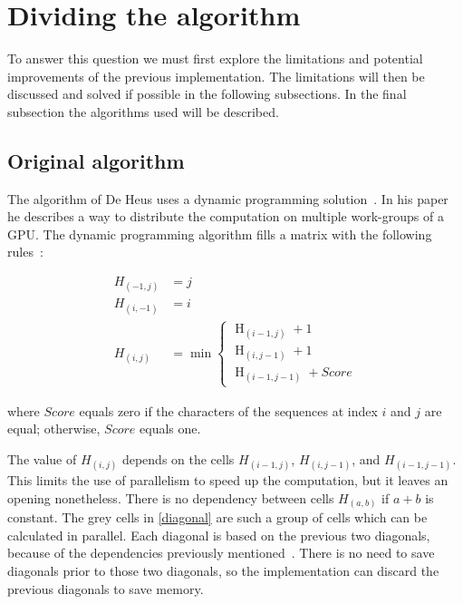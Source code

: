 \section{Dividing the algorithm} \label{q1}
To answer this question we must first explore the limitations and potential improvements of the previous implementation.
The limitations will then be discussed and solved if possible in the following subsections.
In the final subsection the algorithms used will be described.

\subsection{Original algorithm} \label{originalalg}
The algorithm of De Heus uses a dynamic programming solution~\cite{Heus}.
In his paper he describes a way to distribute the computation on multiple work-groups of a GPU.
The dynamic programming algorithm fills a matrix with the following rules~\cite{Jordan}:

\begin{equation} \label{eq1}
\begin{split}
H_{(-1,j)} & = j \\
H_{(i,-1)} & = i \\
H_{(i,j)} & = \min \begin{cases}
          \operatorname{H}_{(i-1,j)} + 1 \\
          \operatorname{H}_{(i,j-1)} + 1 \\
          \operatorname{H}_{(i-1,j-1)} + Score
\end{cases}
\end{split}
\end{equation}

where $Score$ equals zero if the characters of the sequences at index $i$ and $j$ are equal; otherwise, $Score$ equals one.

The value of $H_{(i,j)}$ depends on the cells $H_{(i-1,j)}$, $H_{(i,j-1)}$, and $H_{(i-1,j-1)}$.
This limits the use of parallelism to speed up the computation, but it leaves an opening nonetheless.
There is no dependency between cells $H_{(a,b)}$ if $a + b$ is constant.
The grey cells in \cref{diagonal} are such a group of cells which can be calculated in parallel.
Each diagonal is based on the previous two diagonals, because of the dependencies previously mentioned~\cite{Meyers}.
There is no need to save diagonals prior to those two diagonals, so the implementation can discard the previous diagonals to save memory.


